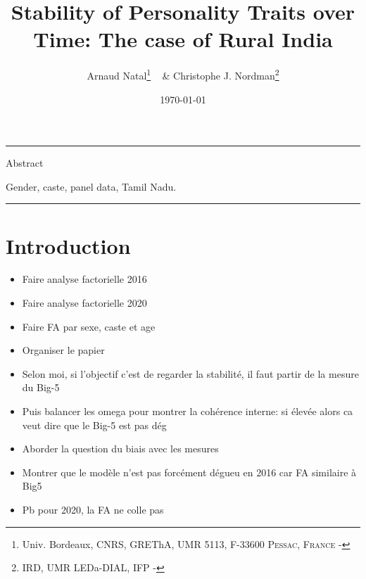 \documentclass[a4paper, 12pt, onecolumn]{article}
\title{Stability of Personality Traits over Time: The case of Rural India}
\author{Arnaud Natal\thanks{Univ. Bordeaux, CNRS, GREThA, UMR 5113, F-33600 \textsc{Pessac, France} - \email{arnaud.natal@u-bordeaux.fr}} ~ \& Christophe J. Nordman\thanks{IRD, UMR LEDa-DIAL, IFP - \email{nordman@dial.prd}} }
\date{\today}
\begin{document}
\maketitle

\hrule 
\vspace{0.3cm}

\begin{resab}{Abstract}
\end{resab}

\begin{keywords}
Gender, caste, panel data, Tamil Nadu.
\end{keywords}

\begin{jelcodes}
\end{jelcodes}

\hrule

\clearpage
\newpage
\section{Introduction}
\label{Introduction}

\begin{itemize}
\item Faire analyse factorielle 2016
\item Faire analyse factorielle 2020
\item Faire FA par sexe, caste et age
\item Organiser le papier
\item Selon moi, si l'objectif c'est de regarder la stabilité, il faut partir de la mesure du Big-5
\item Puis balancer les omega pour montrer la cohérence interne: si élevée alors ca veut dire que le Big-5 est pas dég
\item Aborder la question du biais avec les mesures
\item Montrer que le modèle n'est pas forcément dégueu en 2016 car FA similaire à Big5
\item Pb pour 2020, la FA ne colle pas 
\end{itemize}
\end{document}
